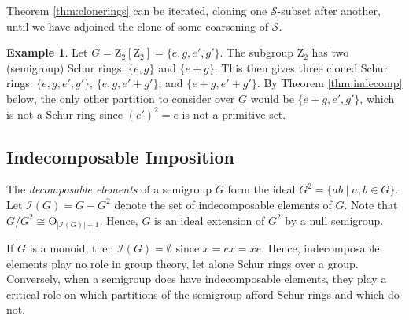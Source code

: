 \documentclass{article}
\theoremstyle{plain}
\theoremstyle{definition}
\newtheorem{Exam}[Thm]{Example}
\newcommand{\thmref}[1]{Theorem \ref{#1}}
\renewcommand{\S}{\mathcal{S}}
\newcommand{\I}{\mathscr{I}}
\renewcommand{\O}{\mathrm{O}}
\newcommand{\z}{\mathrm{Z}}
\begin{document}
\thmref{thm:clonerings} can be iterated, cloning one $\S$-subset after another, until we have adjoined the clone of some coarsening of $\S$. 

\begin{Exam} Let $G = \z_2[\z_2] = \{e, g, e', g'\}$. The subgroup $\z_2$ has two (semigroup) Schur rings: $\{e,g\}$ and $\{e+g\}$. This then gives three cloned Schur rings: $\{e,g,e',g'\}$,  $\{e,g, e'+g'\}$, and $\{e+g, e'+g'\}$. By \thmref{thm:indecomp} below, the only other partition to consider over $G$ would be $\{e+g, e', g'\}$, which is not a Schur ring since $(e')^2 = e$ is not a primitive set.
\end{Exam}


\subsection{Indecomposable Imposition}
The \emph{decomposable elements} of a semigroup $G$ form the ideal $G^2=\{ab \mid a,b \in G\}$. Let \label{decomp}$\I(G) = G- G^2$ denote the set of indecomposable elements of $G$. Note that $G/G^2 \cong \O_{|\I(G)|+1}$. Hence, $G$ is an ideal extension of $G^2$ by a null semigroup.

If $G$ is a monoid, then $\I(G)=\emptyset$ since $x=ex=xe$. Hence, indecomposable elements play no role in group theory, let alone Schur rings over a group. Conversely, when a semigroup does have indecomposable elements, they play a critical role on which partitions of the semigroup afford Schur rings and which do not.
\end{document}
